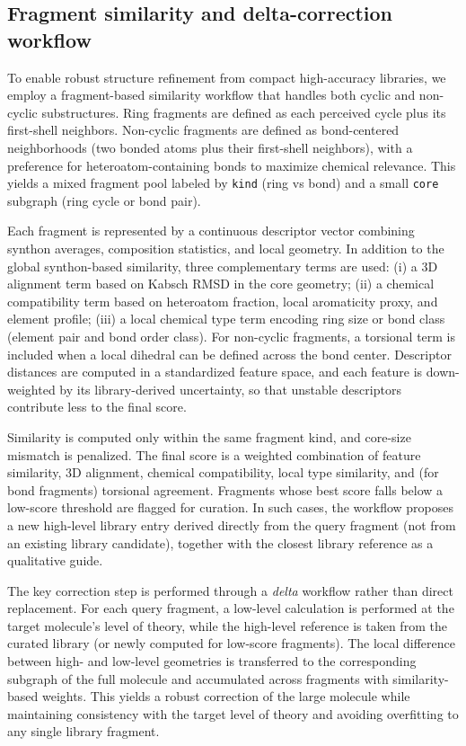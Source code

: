 \documentclass[journal=jctcce,manuscript=article]{achemso}
\begin{document}
\subsection{Fragment similarity and delta-correction workflow}
To enable robust structure refinement from compact high-accuracy libraries, we employ a fragment-based similarity workflow that handles both cyclic and non-cyclic substructures. Ring fragments are defined as each perceived cycle plus its first-shell neighbors. Non-cyclic fragments are defined as bond-centered neighborhoods (two bonded atoms plus their first-shell neighbors), with a preference for heteroatom-containing bonds to maximize chemical relevance. This yields a mixed fragment pool labeled by \texttt{kind} (ring vs bond) and a small \texttt{core} subgraph (ring cycle or bond pair).

Each fragment is represented by a continuous descriptor vector combining synthon averages, composition statistics, and local geometry. In addition to the global synthon-based similarity, three complementary terms are used: (i) a 3D alignment term based on Kabsch RMSD in the core geometry; (ii) a chemical compatibility term based on heteroatom fraction, local aromaticity proxy, and element profile; (iii) a local chemical type term encoding ring size or bond class (element pair and bond order class). For non-cyclic fragments, a torsional term is included when a local dihedral can be defined across the bond center. Descriptor distances are computed in a standardized feature space, and each feature is down-weighted by its library-derived uncertainty, so that unstable descriptors contribute less to the final score.

Similarity is computed only within the same fragment kind, and core-size mismatch is penalized. The final score is a weighted combination of feature similarity, 3D alignment, chemical compatibility, local type similarity, and (for bond fragments) torsional agreement. Fragments whose best score falls below a low-score threshold are flagged for curation. In such cases, the workflow proposes a new high-level library entry derived directly from the query fragment (not from an existing library candidate), together with the closest library reference as a qualitative guide.

The key correction step is performed through a \emph{delta} workflow rather than direct replacement. For each query fragment, a low-level calculation is performed at the target molecule's level of theory, while the high-level reference is taken from the curated library (or newly computed for low-score fragments). The local difference between high- and low-level geometries is transferred to the corresponding subgraph of the full molecule and accumulated across fragments with similarity-based weights. This yields a robust correction of the large molecule while maintaining consistency with the target level of theory and avoiding overfitting to any single library fragment.
\end{document}
